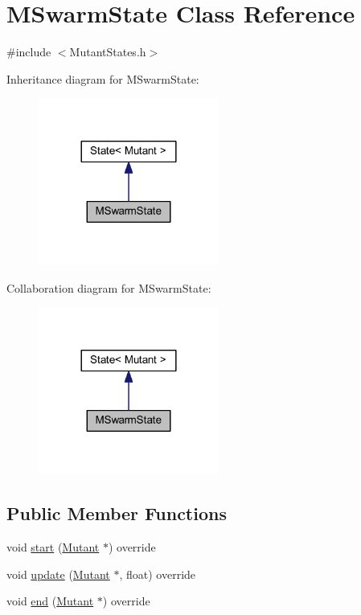 \hypertarget{class_m_swarm_state}{}\section{M\+Swarm\+State Class Reference}
\label{class_m_swarm_state}


{\ttfamily \#include $<$Mutant\+States.\+h$>$}



Inheritance diagram for M\+Swarm\+State\+:
\nopagebreak
\begin{figure}[H]
\begin{center}
\leavevmode
\includegraphics[width=168pt]{class_m_swarm_state__inherit__graph}
\end{center}
\end{figure}


Collaboration diagram for M\+Swarm\+State\+:
\nopagebreak
\begin{figure}[H]
\begin{center}
\leavevmode
\includegraphics[width=168pt]{class_m_swarm_state__coll__graph}
\end{center}
\end{figure}
\subsection*{Public Member Functions}
\begin{DoxyCompactItemize}
\item 
void \hyperlink{class_m_swarm_state_a16fbf13f8cb9436570eb97e829befc3e}{start} (\hyperlink{class_mutant}{Mutant} $\ast$) override
\item 
void \hyperlink{class_m_swarm_state_a7e4abd7da613e0a3d013e149c37f8e40}{update} (\hyperlink{class_mutant}{Mutant} $\ast$, float) override
\item 
void \hyperlink{class_m_swarm_state_aa9ac4ceacb0282421abcbf7fa1d6f217}{end} (\hyperlink{class_mutant}{Mutant} $\ast$) override
\end{DoxyCompactItemize}
